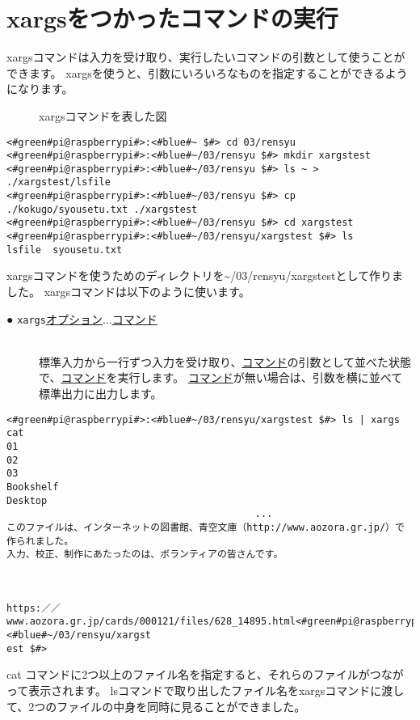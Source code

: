 \newpage
\section{xargsをつかったコマンドの実行}
xargsコマンドは入力を受け取り、実行したいコマンドの引数として使うことができます。
xargsを使うと、引数にいろいろなものを指定することができるようになります。
\begin{figure}[h]
    \centering
    
    \caption{xargsコマンドを表した図}
    \label{ch03:xargs_command}
\end{figure}
\begin{lstlisting}[caption=xargsコマンドを使う準備をする]
<#green#pi@raspberrypi#>:<#blue#~ $#> cd 03/rensyu
<#green#pi@raspberrypi#>:<#blue#~/03/rensyu $#> mkdir xargstest
<#green#pi@raspberrypi#>:<#blue#~/03/rensyu $#> ls ~ > ./xargstest/lsfile
<#green#pi@raspberrypi#>:<#blue#~/03/rensyu $#> cp ./kokugo/syousetu.txt ./xargstest
<#green#pi@raspberrypi#>:<#blue#~/03/rensyu $#> cd xargstest
<#green#pi@raspberrypi#>:<#blue#~/03/rensyu/xargstest $#> ls
lsfile  syousetu.txt
\end{lstlisting}
xargsコマンドを使うためのディレクトリを\textasciitilde /03/rensyu/xargstestとして作りました。
xargsコマンドは以下のように使います。

\begin{description}
    \item[● \texttt{xargs}\textvisiblespace \underline{オプション}$\ldots$\textvisiblespace \underline{コマンド}]\mbox{}\\
    標準入力から一行ずつ入力を受け取り、\underline{コマンド}の引数として並べた状態で、\underline{コマンド}を実行します。
    \underline{コマンド}が無い場合は、引数を横に並べて標準出力に出力します。
\end{description}


\begin{lstlisting}[caption=xargsコマンドを使ってcatコマンドを使う]
<#green#pi@raspberrypi#>:<#blue#~/03/rensyu/xargstest $#> ls | xargs cat
01
02
03
Bookshelf
Desktop
                                           ...
このファイルは、インターネットの図書館、青空文庫（http://www.aozora.gr.jp/）で作られました。
入力、校正、制作にあたったのは、ボランティアの皆さんです。



https:／／www.aozora.gr.jp/cards/000121/files/628_14895.html<#green#pi@raspberrypi#>:<#blue#~/03/rensyu/xargst
est $#>
\end{lstlisting}
cat コマンドに2つ以上のファイル名を指定すると、それらのファイルがつながって表示されます。
lsコマンドで取り出したファイル名をxargsコマンドに渡して、2つのファイルの中身を同時に見ることができました。

